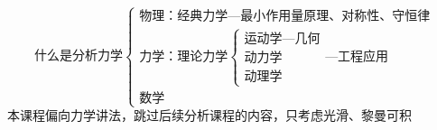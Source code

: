 \documentclass[12pt, a4paper, oneside, UTF8]{ctexbook}  %
\begin{document}
\else
\fi
\chapter{}
\section{}
\begin{add}
\[
\text{什么是分析力学}\begin{cases}
    \text{物理：经典力学---最小作用量原理、对称性、守恒律}\\
    \text{力学：理论力学}\begin{cases}
        \text{运动学---几何}\\
        \text{动力学}\\
        \text{动理学}
    \end{cases}\text{---工程应用}\\
    \text{数学}
\end{cases}
\]
本课程偏向力学讲法，跳过后续分析课程的内容，只考虑光滑、黎曼可积
\end{add}
\end{document}
